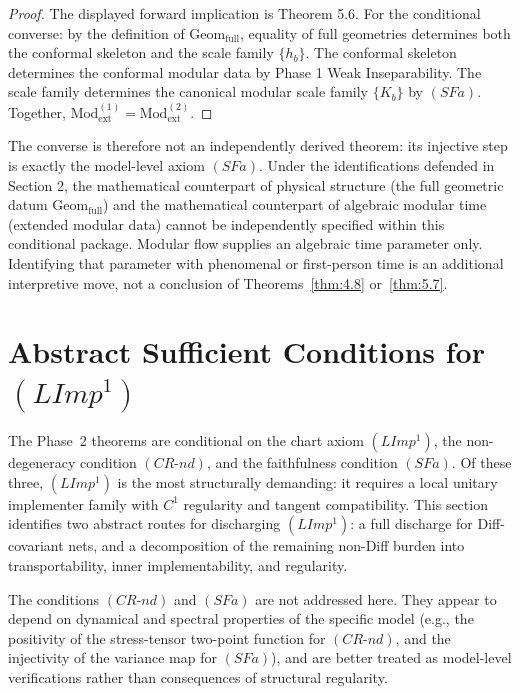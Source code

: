 \documentclass[12pt]{article}
\theoremstyle{definition}
\theoremstyle{remark}
\begin{document}
\begin{proof}
The displayed forward implication is Theorem 5.6.
For the conditional converse: by the definition of
\(\mathrm{Geom}_{\mathrm{full}}\), equality of full geometries
determines both the conformal skeleton and the scale family \(\{h_b\}\).
The conformal skeleton determines the conformal modular data by Phase 1
Weak Inseparability. The scale family determines the canonical modular
scale family \(\{K_b\}\) by \((SFa)\). Together,
\(\mathrm{Mod}_{\mathrm{ext}}^{(1)} = \mathrm{Mod}_{\mathrm{ext}}^{(2)}\).
\end{proof}

The converse is therefore not an independently derived theorem: its
injective step is exactly the model-level axiom \((SFa)\). Under the
identifications defended in Section 2, the mathematical counterpart of
physical structure (the full geometric datum
\(\mathrm{Geom}_{\mathrm{full}}\)) and the mathematical counterpart of
algebraic modular time (extended modular data) cannot be independently
specified within this conditional package. Modular flow supplies an
algebraic time parameter only. Identifying that parameter with
phenomenal or first-person time is an additional interpretive move, not
a conclusion of Theorems~\ref{thm:4.8} or~\ref{thm:5.7}.

\section{Abstract Sufficient Conditions for \texorpdfstring{$(LImp^1)$}{(LImp1)}}\label{sufficient-conditions-limp}

The Phase~2 theorems are conditional on the chart axiom $(LImp^1)$, the non-degeneracy condition $(CR\text{-}nd)$, and the faithfulness condition $(SFa)$. Of these three, $(LImp^1)$ is the most structurally demanding: it requires a local unitary implementer family with $C^1$ regularity and tangent compatibility. This section identifies two abstract routes for discharging $(LImp^1)$: a full discharge for Diff-covariant nets, and a decomposition of the remaining non-Diff burden into transportability, inner implementability, and regularity.

The conditions $(CR\text{-}nd)$ and $(SFa)$ are not addressed here. They appear to depend on dynamical and spectral properties of the specific model (e.g., the positivity of the stress-tensor two-point function for $(CR\text{-}nd)$, and the injectivity of the variance map for $(SFa)$), and are better treated as model-level verifications rather than consequences of structural regularity.
\end{document}
